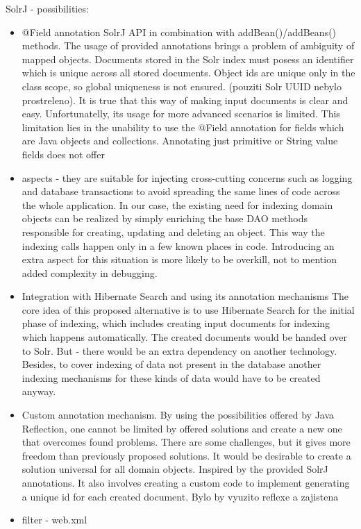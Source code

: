 \documentclass[12pt, oneside, a4paper]{book}
\begin{document}
SolrJ - possibilities:
\begin{itemize}
\item @Field annotation SolrJ API in combination with addBean()/addBeans() methods.
The usage of provided annotations brings a problem of ambiguity of mapped objects. Documents stored in the Solr index must posess an identifier which is unique across all stored documents. Object ids are unique only in the class scope, so global uniqueness is not ensured. (pouziti Solr UUID nebylo
prostreleno). It is true that this way of making input documents is clear and easy. Unfortunatelly, its usage for more advanced scenarios is limited. This limitation lies in the unability to use the @Field annotation for fields which are Java objects and collections. Annotating just primitive or String value fields does not offer 

\item aspects - they are suitable for injecting cross-cutting concerns such as logging and database transactions to avoid spreading the same lines of code across the whole application. 
In our case, the existing need for indexing domain objects can be realized by simply enriching the base DAO methods responsible for creating, updating and deleting an object. This way the indexing calls happen only in a few known places in code. Introducing an extra aspect for this situation is more likely to be overkill, not to mention added complexity in debugging.

\item Integration with Hibernate Search and using its annotation mechanisms
The core idea of this proposed alternative is to use Hibernate Search for the initial phase of indexing, which includes creating input documents for indexing which happens automatically. The created documents would be handed over to Solr.
But - there would be an extra dependency on another technology. Besides, to cover indexing of data not present in the database another indexing mechanisms for these kinds of data would have to be created anyway. 

\item Custom annotation mechanism. By using the possibilities offered by Java Reflection, one cannot be limited by offered solutions and create a new one that overcomes found problems. There are some challenges, but it gives more freedom than previously proposed solutions. It would be desirable to create a solution universal for all domain objects. Inspired by the provided SolrJ annotations. It also involves creating a custom code to implement generating a unique id for each created document.  Bylo by vyuzito reflexe a zajistena

\item filter - web.xml
\end{itemize}
\end{document}
